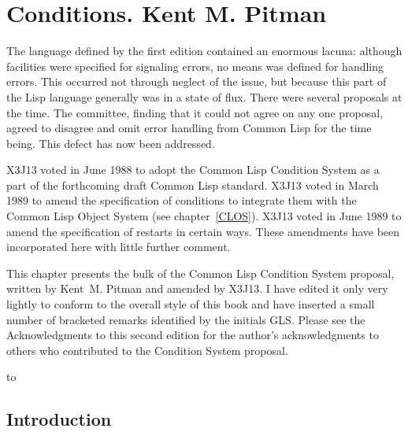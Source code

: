 
\clearpage\def\pagestatus{FINAL PROOF}


\def\SU#1{${}_{#1}$}

\chapter{Conditions. Kent M. Pitman}
\label{CONDITION}

\prefaceword
\begin{new}
The language defined by the first edition contained an enormous lacuna:
although facilities were specified for signaling errors,
no means was defined for handling errors.  This occurred not through neglect
of the issue, but because this part of the Lisp language generally
was in a state of flux.  There were several proposals at the
time.  The committee, finding that it could not agree on any one proposal,
agreed to disagree and omit error handling from Common Lisp for the time being.
This defect has now been addressed.
\end{new}

X3J13 voted in June 1988
to adopt the Common Lisp Condition System
as a part of the forthcoming draft Common Lisp standard.
X3J13 voted in March 1989 
to amend the specification of conditions to integrate them
with the Common Lisp Object System (see chapter~\ref{CLOS}). 
X3J13 voted in June 1989  to amend the
specification of restarts in certain ways. These amendments have
been incorporated here with little further comment.

This chapter presents the bulk of the Common Lisp
Condition System proposal, written by Kent~M. Pitman
and amended by X3J13.  I have edited it only very lightly
to conform to the overall style of this book and have inserted a small
number of bracketed remarks identified by the initials GLS.
Please see the Acknowledgments to this second edition for the author's
acknowledgments to others who contributed to the Condition System proposal.

\noindent\hbox to \textwidth{\hss---Guy L. Steele Jr.}



\section{Introduction}

